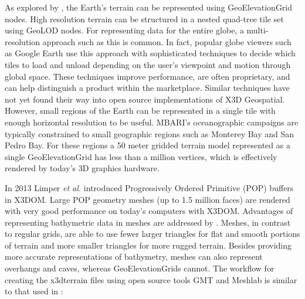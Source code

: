 \documentclass[conference]{IEEEtran}
\begin{document}
As explored by \cite{yoo09}, the Earth's terrain can be represented using GeoElevationGrid nodes. High resolution terrain can be structured in a nested quad-tree tile set using GeoLOD nodes. For representing data for the entire globe, a multi-resolution approach such as this is common. In fact, popular globe viewers such as Google Earth use this approach with sophisticated techniques to decide which tiles to load and unload depending on the user's viewpoint and motion through global space. These techniques improve performance, are often proprietary, and can help distinguish a product within the marketplace. Similar techniques have not yet found their way into open source implementations of X3D Geospatial. However, small regions of the Earth can be represented in a single tile with enough horizontal resolution to be useful. MBARI's oceanographic campaigns are typically constrained to small geographic regions such as Monterey Bay and San Pedro Bay. For these regions a 50 meter gridded terrain model represented as a single GeoElevationGrid has less than a million vertices, which is effectively  rendered by today's 3D graphics hardware.

In 2013 Limper \textit{et al.} \cite{Limper:2013:FDW:2466533.2466536} introduced Progressively Ordered Primitive (POP) buffers in X3DOM. Large POP geometry meshes (up to 1.5 million faces) are rendered with very good performance on today's computers with X3DOM. Advantages of representing bathymetric data in meshes are addressed by \cite{Becker:2005:NPN:1650409.1650513}. Meshes, in contrast to regular grids, are able to use fewer larger triangles for flat and smooth portions of terrain and more smaller triangles for more rugged terrain. Besides providing more accurate representations of bathymetry, meshes can also represent overhangs and caves, whereas GeoElevationGrids cannot. The workflow for creating the x3dterrain files using open source tools GMT \cite{GMT} and Meshlab \cite{Meshlab} is similar to that used in \cite{Silvestre}:
\end{document}
